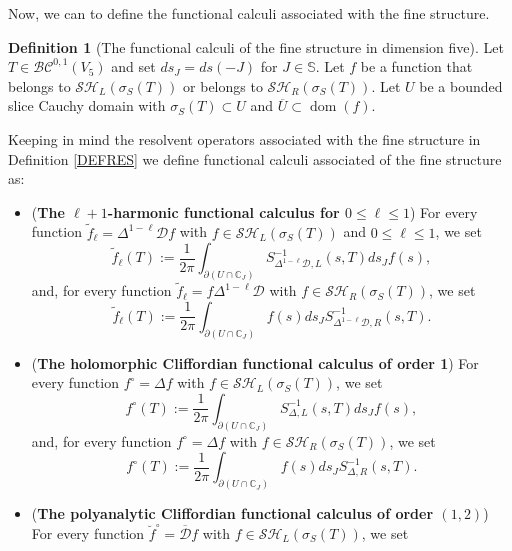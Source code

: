 \documentclass[reqno,11pt]{amsart}
\numberwithin{equation}{section}
\newcommand{\bigD}{\mathcal{D}}
\theoremstyle{definition}
\newtheorem{definition}[theorem]{Definition}
\begin{document}
Now, we can to define the functional calculi associated with the fine structure.

\begin{definition}[The functional calculi of the fine structure in dimension five]\label{fcalc}
	Let $T \in \mathcal{BC}^{0,1}(V_5)$ and set $ds_J=ds(-J)$ for $J \in \mathbb{S}$. Let $f$ be a function that belongs to $\mathcal{SH}_L(\sigma_S(T))$ or belongs to $\mathcal{SH}_R(\sigma_S(T))$. Let $U$ be a bounded slice Cauchy domain with $\sigma_S(T)\subset U$ and $\overline U\subset\operatorname{dom}(f)$.

Keeping in mind the resolvent operators associated with the fine structure in  Definition \ref{DEFRES} we
define functional calculi associated of the fine structure as:
	\begin{itemize}
		\item ({\bf The $\ell+1$-harmonic functional calculus for $0\leq\ell\leq 1$}) For every function $\tilde{f}_\ell=\Delta^{1-\ell}\mathcal{D}f$ with $f \in \mathcal{SH}_L(\sigma_S(T))$ and $0\leq\ell\leq 1$, we set
		\begin{equation}
			\label{fun1}
			\tilde{f}_\ell(T):=\frac 1{2\pi} \int_{\partial(U \cap \mathbb{C}_J)} S^{-1}_{\Delta^{1-\ell}\bigD,L}(s,T) ds_J f(s),
		\end{equation}
		and, for every function $ \tilde{f}_\ell=f\Delta^{1-\ell}\mathcal{D}$ with $f \in \mathcal{SH}_R(\sigma_S(T))$, we set
		\begin{equation}
			\label{fun2}
			\tilde{f}_\ell(T):=\frac 1{2\pi} \int_{\partial(U \cap \mathbb{C}_J)} f(s) ds_JS^{-1}_{\Delta^{1-\ell}\bigD,R}(s,T).
		\end{equation}
		\item ({\bf The holomorphic Cliffordian functional calculus of order 1}) For every function $f^\circ=\Delta f$ with $f \in \mathcal{SH}_L(\sigma_S(T))$, we set
		\begin{equation}
			\label{fun3}
			f^\circ(T):= \frac{1}{2\pi} \int_{\partial(U \cap \mathbb{C}_J)}
S^{-1}_{\Delta,L}(s,T) ds_J f(s),
		\end{equation}
		and, for every function $f^\circ=\Delta f$ with $f \in \mathcal{SH}_R(\sigma_S(T))$, we set
		\begin{equation}
			\label{fun4}
			f^\circ(T):= \frac{1}{2\pi} \int_{\partial(U \cap \mathbb{C}_J)} f(s) ds_JS^{-1}_{\Delta,R}(s,T).
		\end{equation}
		\item ({\bf The polyanalytic Cliffordian functional calculus of order $(1,2)$}) For every function $\breve f^\circ=\overline{\mathcal{D}}f$ with $f \in \mathcal{SH}_L(\sigma_S(T))$, we set

\end{itemize}
\end{definition}
\end{document}
